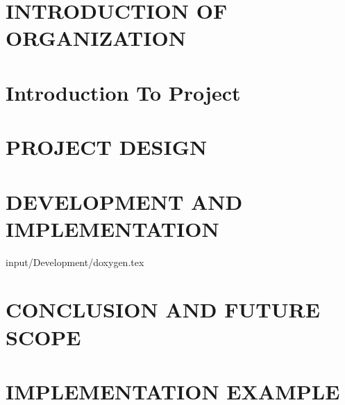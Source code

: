 \documentclass[12pt,includeheadfoot,a4paper]{report}
\begin{document}


\thispagestyle{empty} 
\pagetitle
\newpage
{}
\cfoot{\thepage}



\newpage


\newpage
\tableofcontents
\newpage
\listoffigures
\newpage


\cfoot{\thepage}

\newpage
\chapter{INTRODUCTION OF ORGANIZATION}

\newpage


\chapter{Introduction To Project}








\chapter{PROJECT DESIGN}


%





\newpage
\chapter{DEVELOPMENT AND IMPLEMENTATION}


%
%
%
%
%

 {input/Development/doxygen.tex}




\chapter{CONCLUSION AND FUTURE SCOPE}







\appendix
\chapter{IMPLEMENTATION EXAMPLE}

\end{document}
